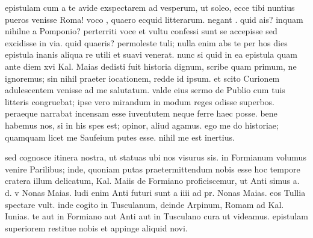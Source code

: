 


 epistulam cum a te avide exspectarem ad vesperum, ut soleo, ecce tibi nuntius pueros venisse Roma! voco , quaero ecquid litterarum. negant . quid ais? inquam nihilne a Pomponio? perterriti voce et vultu confessi sunt se accepisse sed excidisse in via. quid quaeris? permoleste tuli; nulla enim abs te per hos dies epistula inanis aliqua re utili et suavi venerat. nunc si quid in ea epistula quam ante diem xvi Kal. Maias dedisti fuit historia dignum, scribe quam primum, ne ignoremus; sin nihil praeter iocationem, redde id ipsum. et scito Curionem adulescentem venisse ad me salutatum. valde eius sermo de Publio cum tuis litteris congruebat; ipse vero mirandum in modum reges odisse superbos. peraeque narrabat incensam esse iuventutem neque ferre haec posse. bene habemus nos, si in his spes est; opinor, aliud agamus. ego me do historiae; quamquam licet me Saufeium putes esse. nihil me est inertius.

 sed cognosce itinera nostra, ut statuas ubi nos visurus sis. in Formianum volumus venire Parilibus; inde, quoniam putas praetermittendum nobis esse hoc tempore cratera illum delicatum, Kal. Maiis de Formiano proficiscemur, ut Anti simus a. d. v Nonas Maias. ludi enim Anti futuri sunt a iiii ad pr. Nonas Maias. eos Tullia spectare vult. inde cogito in Tusculanum, deinde Arpinum, Romam ad Kal. Iunias. te aut in Formiano aut Anti aut in Tusculano cura ut videamus. epistulam superiorem restitue nobis et appinge aliquid novi.
